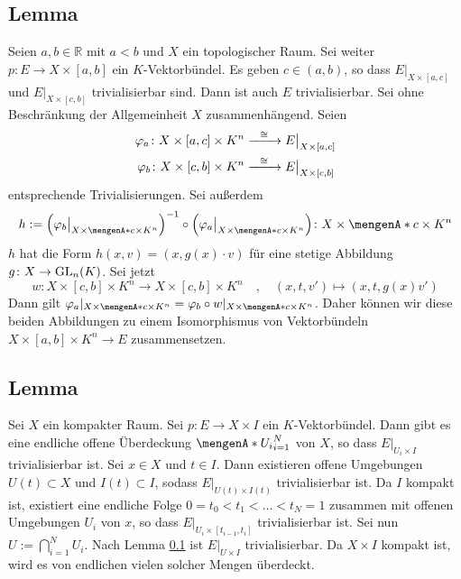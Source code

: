 \subsection[{Lemma: Trivialisierbarkeit von $E \to X \times [a,b]$, wenn $E|_{X \times [a,c]}$, $E|_{X \times [c,b]}$ trivialisierbar}]{Lemma} %
\label{sub:28}
Seien $a,b \in \mathds{R}$ mit $a <b$ und $X$ ein topologischer Raum. Sei weiter $p \colon E \to X \times [a,b]$ ein $K$-Vektorbündel. Es geben $c \in (a,b)$, so dass 
$E|_{X \times [a,c]}$ und $E|_{X \times [c,b]}$ trivialisierbar sind. Dann ist auch $E$ trivialisierbar.
Sei ohne Beschränkung der Allgemeinheit $X$ zusammenhängend. Seien 
\begin{align*}
	\varphi_a \colon X \times [a,c] \times K^n &\xrightarrow{\minwidthbox{\cong}{2em}} E\big|_{X \times [a,c]} \\ 
	\varphi_b \colon X \times [c,b] \times K^n &\xrightarrow{\minwidthbox{\cong}{2em}} E\big|_{X \times [c,b]}
\end{align*}
entsprechende Trivialisierungen. Sei außerdem
\[
	h := \enbrace*{\varphi_b\big|_{X \times \set{c} \times K^n }} ^{-1} \circ  \enbrace*{\varphi_a\big|_{X \times \set{c} \times K^n}} \colon X \times \set{c} \times K^n    
\]
$h$ hat die Form $h(x,v)= (x , g(x) \cdot v)$ für eine stetige Abbildung $g \colon X \to \operatorname{GL}_n(K)$. Sei jetzt 
\[
	w \colon X \times [c,b] \times K^n \longrightarrow X \times [c,b] \times K^n \quad , \quad (x,t,v') \longmapsto (x,t,g(x)v')
\]
Dann gilt $\varphi_a|_{X \times \set{c} \times K^n} = \varphi_b \circ w |_{X \times \set{c} \times K^n }$. Daher können wir diese beiden Abbildungen zu einem Isomorphismus 
von Vektorbündeln $X \times [a,b] \times K^n \to E$ zusammensetzen. \bewende 

\subsection[Lemma: Endliche Überdeckung $\set{U_i}_{i=1}^N$, sodass Trivialisierbarkeit auf $U_i$ gilt]{Lemma} %
\label{sub:29}
Sei $X$ ein kompakter Raum. Sei $p \colon E \to X \times I$ ein $K$-Vektorbündel. Dann gibt es eine endliche offene Überdeckung $\set{U_i}_{i=1}^N$ von $X$, so dass 
$E|_{U_i \times I}$ trivialisierbar ist.
Sei $x \in X$ und $t \in I$. Dann existieren offene Umgebungen $U(t) \subset X$ und $I(t) \subset I$, sodass $E|_{U(t) \times I(t)}$ trivialisierbar ist. Da $I$ kompakt ist,
existiert eine endliche Folge $0=t_0 < t_1 < \ldots < t_N =1$ zusammen mit offenen Umgebungen $U_i$ von $x$, so dass $E|_{U_i \times [t_{i-1}, t_i]}$ trivialisierbar ist. 
Sei nun $U := \bigcap_{i=1}^N U_i$. Nach Lemma \ref{sub:28} ist $E|_{U \times I}$ trivialisierbar. Da $X \times I$ kompakt ist, wird es von endlichen vielen solcher Mengen
überdeckt. \bewende

